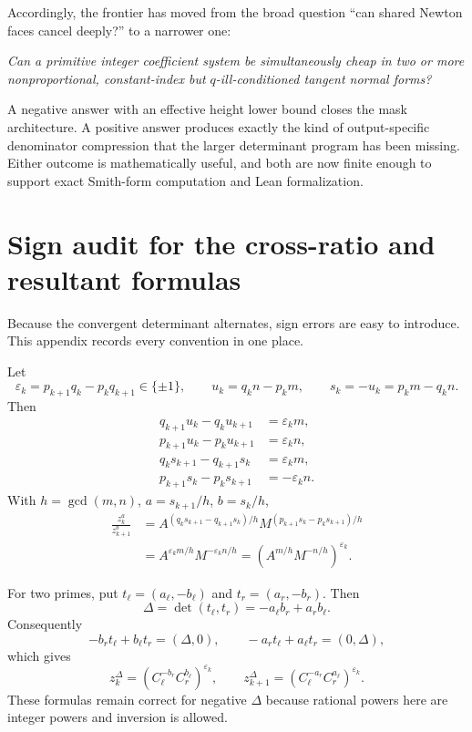 \documentclass[11pt,oneside]{article}
\theoremstyle{definition}
\theoremstyle{remark}
\newcommand{\eps}{\varepsilon}
\begin{document}
Accordingly, the frontier has moved from the broad question ``can shared Newton faces cancel
deeply?'' to a narrower one:

\begin{center}
\begin{minipage}{0.88\textwidth}
\emph{Can a primitive integer coefficient system be simultaneously cheap in two or more
nonproportional, constant-index but $q$-ill-conditioned tangent normal forms?}
\end{minipage}
\end{center}

A negative answer with an effective height lower bound closes the mask architecture.  A
positive answer produces exactly the kind of output-specific denominator compression that
the larger determinant program has been missing.  Either outcome is mathematically useful,
and both are now finite enough to support exact Smith-form computation and Lean
formalization.

\appendix

\section{Sign audit for the cross-ratio and resultant formulas}
\label{app:signs}

Because the convergent determinant alternates, sign errors are easy to introduce.  This
appendix records every convention in one place.

Let
\[
 \eps_k=p_{k+1}q_k-p_kq_{k+1}\in\{\pm1\},
 \qquad
 u_k=q_kn-p_km,
 \qquad
 s_k=-u_k=p_km-q_kn.
\]
Then
\begin{align*}
 q_{k+1}u_k-q_ku_{k+1}&=\eps_km,\\
 p_{k+1}u_k-p_ku_{k+1}&=\eps_kn,\\
 q_ks_{k+1}-q_{k+1}s_k&=\eps_km,\\
 p_{k+1}s_k-p_ks_{k+1}&=-\eps_kn.
\end{align*}
With $h=\gcd(m,n)$, $a=s_{k+1}/h$, $b=s_k/h$,
\begin{align*}
 \frac{z_k^a}{z_{k+1}^b}
 &=A^{(q_ks_{k+1}-q_{k+1}s_k)/h}
   M^{(p_{k+1}s_k-p_ks_{k+1})/h}\\
 &=A^{\eps_km/h}M^{-\eps_kn/h}
 =\left(A^{m/h}M^{-n/h}\right)^{\eps_k}.
\end{align*}

For two primes, put $t_\ell=(a_\ell,-b_\ell)$ and
$t_r=(a_r,-b_r)$.  Then
\[
 \Delta=\det(t_\ell,t_r)=-a_\ell b_r+a_rb_\ell.
\]
Consequently
\[
 -b_rt_\ell+b_\ell t_r=(\Delta,0),
 \qquad
 -a_rt_\ell+a_\ell t_r=(0,\Delta),
\]
which gives
\[
 z_k^\Delta=(C_\ell^{-b_r}C_r^{b_\ell})^{\eps_k},
 \qquad
 z_{k+1}^\Delta=(C_\ell^{-a_r}C_r^{a_\ell})^{\eps_k}.
\]
These formulas remain correct for negative $\Delta$ because rational powers here are integer
powers and inversion is allowed.
\end{document}

